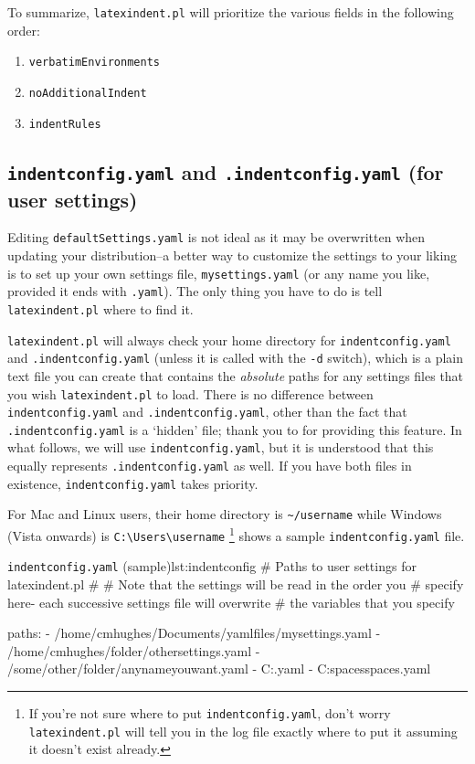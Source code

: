 \documentclass[11pt]{article}
\begin{document}
To summarize, \lstinline!latexindent.pl! will prioritize the various fields in the
following order:
\begin{enumerate}
	\item \lstinline!verbatimEnvironments!
	\item \lstinline!noAdditionalIndent!
	\item \lstinline!indentRules!
\end{enumerate}
\subsection{\lstinline!indentconfig.yaml! and \lstinline!.indentconfig.yaml! (for user settings)}\label{sec:indentconfig}
Editing \lstinline!defaultSettings.yaml! is not ideal as it may be overwritten when
updating your distribution--a better way to customize the settings to your liking
is to set up your own settings file,
\lstinline!mysettings.yaml! (or any name you like, provided it ends with \lstinline!.yaml!).
The only thing you have to do is tell \lstinline!latexindent.pl! where to find it.

\lstinline!latexindent.pl! will always check your home directory for \lstinline!indentconfig.yaml!
and  \lstinline!.indentconfig.yaml! (unless
it is called with the \lstinline!-d! switch),
which is a plain text file you can create that contains the \emph{absolute}
paths for any settings files that you wish \lstinline!latexindent.pl! to load. There is no difference
between \lstinline!indentconfig.yaml! and \lstinline!.indentconfig.yaml!, other than the 
fact that \lstinline!.indentconfig.yaml! is a `hidden' file; thank you to \cite{jacobo-diaz-hidden-config}
for providing this feature. In what follows, we will use \lstinline!indentconfig.yaml!, but it 
is understood that this equally represents \lstinline!.indentconfig.yaml! as well. If you 
have both files in existence,  \lstinline!indentconfig.yaml! takes priority. 

For Mac and Linux users, their home directory is \lstinline!~/username! while
Windows (Vista onwards) is \lstinline!C:\Users\username! \footnote{If you're not sure
	where to put \lstinline!indentconfig.yaml!, don't
	worry \lstinline!latexindent.pl! will tell you in the log file exactly where to
put it assuming it doesn't exist already.}
 shows a sample \lstinline!indentconfig.yaml! file.

\begin{cmhlistings}[style=yaml]{\lstinline!indentconfig.yaml! (sample)}{lst:indentconfig}
# Paths to user settings for latexindent.pl
#
# Note that the settings will be read in the order you
# specify here- each successive settings file will overwrite
# the variables that you specify

paths:
- /home/cmhughes/Documents/yamlfiles/mysettings.yaml
- /home/cmhughes/folder/othersettings.yaml
- /some/other/folder/anynameyouwant.yaml
- C:\Users\chughes\Documents\mysettings.yaml
- C:\Users\chughes\Desktop\test spaces\more spaces.yaml
\end{cmhlistings}
\end{document}
